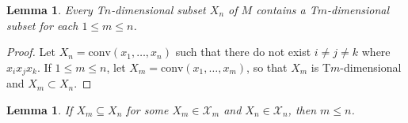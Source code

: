 \documentclass{bcp92}
\theoremstyle{plain}
\newtheorem{lem}[thm]{Lemma}
\theoremstyle{definition}
\begin{document}
\begin{lem} \label{lower-dim}
Every {\rm T}$n$-dimensional subset $X_n$ of $M$ contains a {\rm
T}$m$-dimensional subset for each $1 \leq m \leq n$.
\end{lem}

\begin{proof}
Let $X_n = \text{conv}(x_1, \dots, x_{n})$ such that there do not exist $i
\neq j \neq k$ where $x_i x_j x_k$. If $1 \leq m \leq n$, let $X_m =
\text{conv}(x_1, \dots, x_{m})$, so that $X_m$ is T$m$-dimensional and $X_m
\subset X_n$.
\end{proof}

\begin{lem} \label{nolarger}
If $X_m \subseteq X_n$ for some $X_m \in \mathcal{X}_m$ and $X_n \in
\mathcal{X}_n$, then $m \leq n$.
\end{lem}
\end{document}

